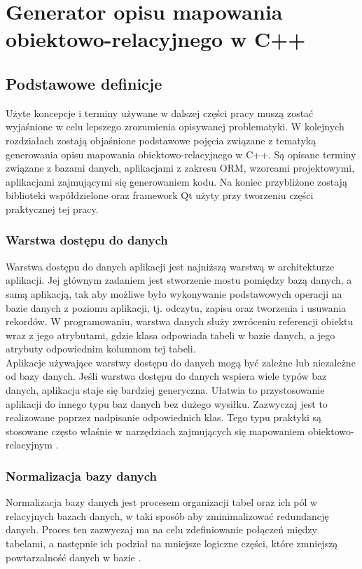 \documentclass[12pt]{report}
\begin{document}
\chapter{Generator opisu mapowania obiektowo-relacyjnego w C++}\label{chap:generator}
\section{Podstawowe definicje}
Użyte koncepcje i terminy używane w dalszej części pracy muszą zostać wyjaśnione w celu lepszego zrozumienia opisywanej problematyki. W kolejnych rozdziałach zostają objaśnione podstawowe pojęcia związane z tematyką generowania opisu mapowania obiektowo-relacyjnego w C++. Są opisane terminy związane z bazami danych, aplikacjami z zakresu ORM, wzorcami projektowymi, aplikacjami zajmującymi się generowaniem kodu. Na koniec przybliżone zostają biblioteki współdzielone oraz framework Qt użyty przy tworzeniu części praktycznej tej pracy.
\subsection{Warstwa dostępu do danych}
	\indent Warstwa dostępu do danych aplikacji jest najniższą warstwą w architekturze aplikacji. Jej głównym zadaniem jest stworzenie mostu pomiędzy bazą danych, a samą aplikacją, tak aby możliwe było wykonywanie podstawowych operacji na bazie danych z poziomu aplikacji, tj. odczytu, zapisu oraz tworzenia i usuwania rekordów. W programowaniu, warstwa danych służy zwróceniu referencji obiektu wraz z jego atrybutami, gdzie klasa odpowiada tabeli w bazie danych, a jego atrybuty odpowiednim kolumnom tej tabeli. \\
	\indent Aplikacje używające warstwy dostępu do danych mogą być zależne lub niezależne od bazy danych. Jeśli warstwa dostępu do danych wspiera wiele typów baz danych, aplikacja staje się bardziej generyczna. Ułatwia to przystosowanie aplikacji do innego typu baz danych bez dużego wysiłku. Zazwyczaj jest to realizowane poprzez nadpisanie odpowiednich klas. Tego typu praktyki są stosowane często właśnie w narzędziach zajmujących się mapowaniem obiektowo-relacyjnym \cite{datalayer}.
\subsection{Normalizacja bazy danych}
	\indent Normalizacja bazy danych jest procesem organizacji tabel oraz ich pól w relacyjnych bazach danych, w taki sposób aby zminimalizować redundancję danych. Proces ten zazwyczaj ma na celu zdefiniowanie połączeń między tabelami, a następnie ich podział na mniejsze logiczne części, które zmniejszą powtarzalność danych w bazie \cite{sql}.
\end{document}

